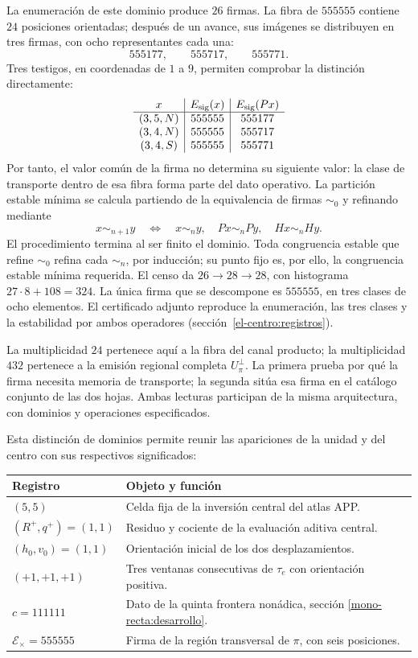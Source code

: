 La enumeración de este dominio produce \(26\) firmas. La fibra de
\(555555\) contiene \(24\) posiciones orientadas; después de un
avance, sus imágenes se distribuyen en tres firmas, con ocho
representantes cada una:
\[
 555177,\qquad555717,\qquad555771.
\]
Tres testigos, en coordenadas de \(1\) a \(9\), permiten comprobar
la distinción directamente:
\[
\begin{array}{c|c|c}
x&E_{\rm sig}(x)&E_{\rm sig}(Px)\\\hline
(3,5,N)&555555&555177\\
(3,4,N)&555555&555717\\
(3,4,S)&555555&555771
\end{array}
\]
Por tanto, el valor común de la firma no determina su siguiente valor:
la clase de transporte dentro de esa fibra forma parte del dato
operativo. La partición estable mínima se calcula partiendo de la
equivalencia de firmas \(\sim_0\) y refinando mediante
\[
 x\sim_{n+1}y\quad\Longleftrightarrow\quad
 x\sim_n y,\quad Px\sim_n Py,\quad Hx\sim_n Hy.
\]
El procedimiento termina al ser finito el dominio. Toda congruencia
estable que refine \(\sim_0\) refina cada \(\sim_n\), por inducción;
su punto fijo es, por ello, la congruencia estable mínima requerida.
El censo da \(26\to28\to28\), con histograma
\(27\cdot8+108=324\). La única firma que se descompone es
\(555555\), en tres clases de ocho elementos. El certificado adjunto
reproduce la enumeración, las tres clases y la estabilidad por ambos
operadores (sección~\ref{el-centro:registros}).

La multiplicidad \(24\) pertenece aquí a la fibra del canal producto;
la multiplicidad \(432\) pertenece a la emisión regional completa
\(U_\pi^\perp\). La primera prueba por qué la firma necesita memoria
de transporte; la segunda sitúa esa firma en el catálogo conjunto de
las dos hojas. Ambas lecturas participan de la misma arquitectura,
con dominios y operaciones especificados.

Esta distinción de dominios permite reunir las apariciones de la unidad
y del centro con sus respectivos significados:
\begin{center}
\small
\begin{tabularx}{\textwidth}{@{}lX@{}}
\toprule
Registro & Objeto y función \\
\midrule
\((5,5)\) & Celda fija de la inversión central del atlas APP.\\
\((R^+,q^+)=(1,1)\) & Residuo y cociente de la evaluación aditiva central.\\
\((h_0,v_0)=(1,1)\) & Orientación inicial de los dos desplazamientos.\\
\((+1,+1,+1)\) & Tres ventanas consecutivas de \(\tau_e\) con orientación positiva.\\
\(c=111111\) & Dato de la quinta frontera nonádica, sección \ref{mono-recta:desarrollo}.\\
\(\mathcal E_\times=555555\) & Firma de la región transversal de \(\pi\), con seis posiciones.\\
\bottomrule
\end{tabularx}
\end{center}

